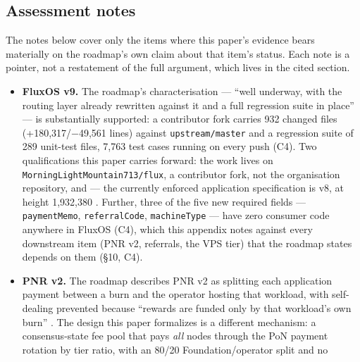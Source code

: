 \subsection{Assessment notes}\label{sec:E2}

The notes below cover only the items where this paper's evidence bears materially on the
roadmap's own claim about that item's status. Each note is a pointer, not a restatement of the
full argument, which lives in the cited section.

\begin{itemize}
\item \textbf{FluxOS v9.} The roadmap's characterisation — ``well underway, with the routing
layer already rewritten against it and a full regression suite in place''
 — is substantially supported: a
contributor fork carries 932 changed files (+180{,}317/$-$49{,}561 lines) against
\texttt{upstream/\allowbreak{}master} and a regression suite of 289 unit-test files, 7{,}763 test cases
running on every push (C4). Two qualifications this paper carries forward: the work lives on
\texttt{MorningLightMountain713/\allowbreak{}flux}, a contributor fork, not the organisation repository, and
 — the currently enforced application
specification is v8, at height
1{,}932{,}380 . Further,
three of the five new required fields — \texttt{paymentMemo}, \texttt{referralCode},
\texttt{machineType} — have zero consumer code anywhere in FluxOS (C4), which this appendix
notes against every downstream item (PNR v2, referrals, the VPS tier) that the roadmap states
depends on them (\S10, C4).
\item \textbf{PNR v2.} The roadmap describes PNR v2 as splitting each application payment
between a burn and the operator hosting that workload, with self-dealing prevented because
``rewards are funded only by that workload's own burn''
. The design this paper
formalizes is a different mechanism: a consensus-state fee pool that pays \emph{all} nodes
through the PoN payment rotation by tier ratio, with an 80/20 Foundation/operator split and no

\end{itemize}
